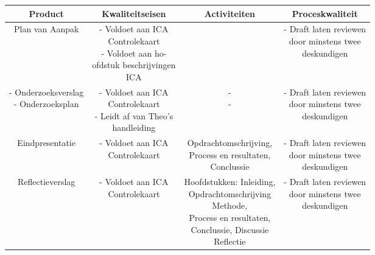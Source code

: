 \small
\begin{center}
 \begin{tabular}{|c c c c|} 
 
 \hline
 Product & Kwaliteitseisen & Activiteiten & Proceskwaliteit \\ [0.5ex] 
 \hline
 Plan van Aanpak & \makecell{
 - Voldoet aan ICA\\Controlekaart \cite{icaControl}\\
 - Voldoet aan ho-\\ofdstuk beschrijvingen\\ICA\cite{pvaTut}
 } & \cite{pvaTut} & \makecell{
 - Draft laten reviewen\\door minstens twee\\deskundigen
 } \\
 \hline

 \hline
 \makecell{
 - Onderzoeksverslag\\
 - Onderzoeksplan
 } & \makecell{
 - Voldoet aan ICA\\Controlekaart \cite{icaControl}\\
 - Leidt af van Theo's\\ handleiding \cite{theoOnderzoek}
 } & \makecell{- \cite{theoOnderzoek}\\ -\cite{icaOnderzoek}} & \makecell{
 - Draft laten reviewen\\door minstens twee\\deskundigen
 } \\
 \hline
 
 \hline
 Eindpresentatie & \makecell{
 - Voldoet aan ICA\\Controlekaart \cite{icaControl}
 } & \makecell{Opdrachtomschrijving,\\Process en resultaten,\\Conclussie} & \makecell{
 - Draft laten reviewen\\door minstens twee\\deskundigen
 } \\
 \hline
 
 \hline
 Reflectieverslag & \makecell{
 - Voldoet aan ICA\\Controlekaart \cite{icaControl}
 } & \makecell{
 Hoofdstukken: Inleiding,\\
 Opdrachtomschrijving\\
 Methode,\\
 Process en resultaten,\\
 Conclussie, Discussie\\
 Reflectie\\
 }& \makecell{
 - Draft laten reviewen\\door minstens twee\\deskundigen
 } \\
 \hline
 

\end{tabular}
\end{center}
